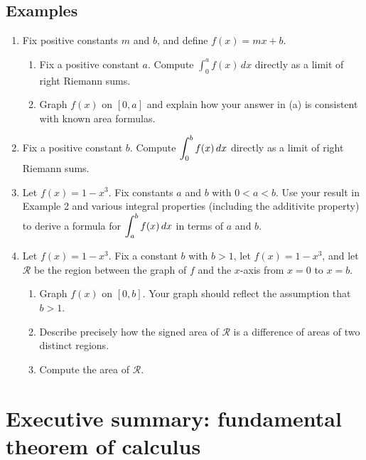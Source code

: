\subsection*{Examples}
\begin{enumerate}
    \item Fix positive constants $m$ and $b$, and define $f(x)=mx+b$.
    \begin{enumerate}
      \item Fix a positive constant $a$. Compute $\int_0^a f(x)\, dx$ directly as a limit of right Riemann sums.
      \item Graph $f(x)$ on $[0,a]$ and explain how your answer in (a) is consistent with known area formulas.
    \end{enumerate}
    \item Fix a positive constant $b$. Compute $\displaystyle\int_0^b f(x)\, dx$ directly as a limit of right Riemann sums.

  \item Let $f(x)=1-x^3$. Fix constants $a$ and $b$ with $0<a<b$. Use your result in Example 2 and various integral properties (including the  additivite property) to derive a formula for $\displaystyle\int_a^bf(x)\, dx$ in terms of $a$ and $b$.

  \item Let $f(x)=1-x^3$. Fix a constant $b$ with $b>1$, let $f(x)=1-x^3$, and let $\mathcal{R}$ be the region between the graph of $f$ and the $x$-axis from $x=0$ to $x=b$.
  \begin{enumerate}
    \item Graph $f(x)$ on $[0,b]$. Your graph should reflect the assumption that $b>1$.
    \item Describe precisely how the signed area of $\mathcal{R}$ is a difference of areas of two distinct regions.
    \item Compute the area of $\mathcal{R}$.
  \end{enumerate}
\end{enumerate}




\newpage

\section{Executive summary: fundamental theorem of calculus}

\thispagestyle{fancy}
